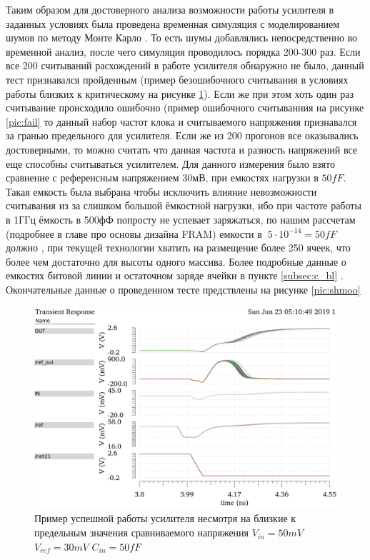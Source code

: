 \documentclass[a4paper,12pt]{article} %
\begin{document}
Таким образом для достоверного анализа возможности работы усилителя в заданных условиях была проведена временная симуляция с моделированием шумов по методу Монте Карло \cite{carlo}. То есть шумы добавлялись непосредственно во временной анализ, после чего симуляция  проводилось порядка 200-300 раз. Если все 200 считываний расхождений в работе усилителя обнаружно не было, данный тест признавался пройденным (пример безошибочного считывания в условиях работы близких к критическому на рисунке \ref{pic:ok}). Если же при этом хоть один раз считывание происходило ошибочно (пример ошибочного считыванния на рисунке \ref{pic:fail} то данный набор частот клока и считываемого напряжения признавался за гранью предельного для усилителя. Если же из 200 прогонов все оказывались достоверными, то можно считать что данная частота и разность напряжений все еще способны считываться усилителем. Для данного измерения было взято сравнение с референсным напряжением 30мВ, при емкостях нагрузки в $50 fF$. Такая емкость была выбрана чтобы исключить влияние невозможности считывания из за слишком большой ёмкостной нагрузки, ибо при частоте работы в 1ГГц ёмкость в 500фФ попросту не успевает заряжаться, по нашим рассчетам (подробнее в главе про основы дизайна FRAM) емкости в $~5\cdot10^{-14}=50fF  $  должно , при текущей технологии  хватить на размещение более 250 ячеек, что более чем достаточно для высоты одного массива. Более подробные данные о емкостях битовой линии и остаточном заряде ячейки в пункте \ref{subsec:c_bl} . Окончательные данные о проведенном тесте предствлены на рисунке \ref{pic:shmoo}




\begin{figure}
  \begin{center}
    \includegraphics[width=0.8\linewidth]{ok.png}
  \end{center}
  \caption{Пример успешной работы усилителя несмотря на близкие к предельным значения сравниваемого напряжения $V_{in}=50mV $ $ V_{ref}=30mV $ $C_{in}=50fF $}
  \label{pic:ok}
\end{figure}
\end{document}
